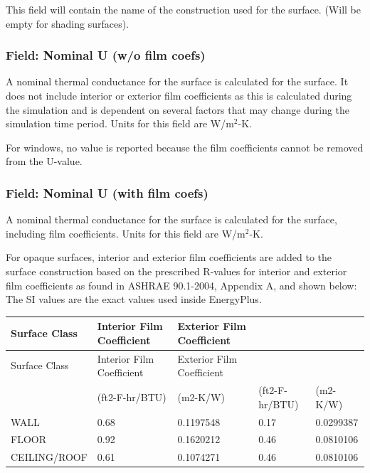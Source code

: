 This field will contain the name of the construction used for the surface. (Will be empty for shading surfaces).

\subsubsection{Field: Nominal U (w/o film coefs)}\label{field-nominal-u-wo-film-coefs}

A nominal thermal conductance for the surface is calculated for the surface. It does not include interior or exterior film coefficients as this is calculated during the simulation and is dependent on several factors that may change during the simulation time period. Units for this field are W/m\(^{2}\)-K.

For windows, no value is reported because the film coefficients cannot be removed from the U-value.

\subsubsection{Field: Nominal U (with film coefs)}\label{field-nominal-u-with-film-coefs}

A nominal thermal conductance for the surface is calculated for the surface, including film coefficients. Units for this field are W/m\(^{2}\)-K.

For opaque surfaces, interior and exterior film coefficients are added to the surface construction based on the prescribed R-values for interior and exterior film coefficients as found in ASHRAE 90.1-2004, Appendix A, and shown below: The SI values are the exact values used inside EnergyPlus.

\begin{longtable}[c]{p{1.2in}p{1.2in}p{1.2in}p{1.2in}p{1.2in}}
\toprule
Surface Class & Interior Film Coefficient & Exterior Film Coefficient \tabularnewline
\midrule
\endfirsthead

\toprule
Surface Class & Interior Film Coefficient & Exterior Film Coefficient \tabularnewline
\midrule
\endhead

 & (ft2-F-hr/BTU) & (m2-K/W) & (ft2-F-hr/BTU) & (m2-K/W) \tabularnewline
WALL & 0.68 & 0.1197548 & 0.17 & 0.0299387 \tabularnewline
FLOOR & 0.92 & 0.1620212 & 0.46 & 0.0810106 \tabularnewline
CEILING/ROOF & 0.61 & 0.1074271 & 0.46 & 0.0810106 \tabularnewline
\bottomrule
\end{longtable}

